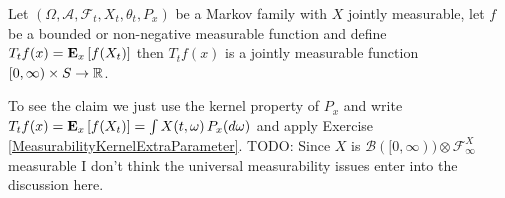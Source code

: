 \begin{clm}Let $(\Omega, \mathcal{A}, \mathcal{F}_t, X_t, \theta_t, P_x)$ be a Markov family with $X$ jointly measurable, let $f$ be a bounded or non-negative measurable function and define $T_tf(x) = \sexpectation{f(X_t)}{x}$ then $T_tf(x)$ is a jointly measurable function $[0,\infty) \times S \to \reals$.
\end{clm}
To see the claim we just use the kernel property of $P_x$ and write $T_tf(x) = \sexpectation{f(X_t)}{x} = \int X(t, \omega) \, P_x(d\omega)$ and apply Exercise \ref{MeasurabilityKernelExtraParameter}.  TODO:  Since $X$ is $\mathcal{B}([0,\infty)) \otimes \mathcal{F}^X_\infty$ measurable I don't think the universal measurability issues enter into the discussion here.


